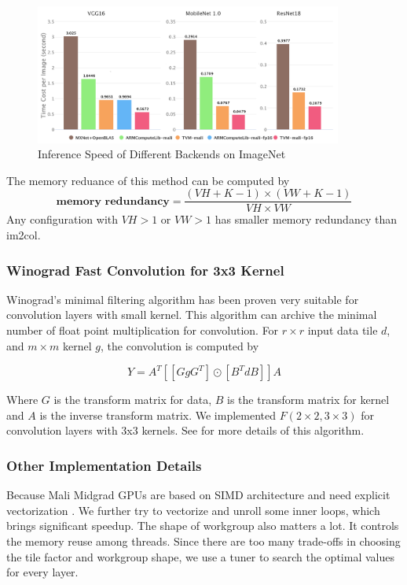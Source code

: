 \documentclass[sigplan]{acmart}
\begin{document}
\begin{figure}[h]
\centering
\includegraphics[width=0.9\textwidth]{figures/new_results.png}
\caption{Inference Speed of Different Backends on ImageNet}
\label{fig:end}
\end{figure}

The memory reduance of this method can be computed by
$$\textbf{memory redundancy} = \frac{(VH + K -1) \times (VW + K - 1)}{VH \times VW}$$
Any configuration  with $VH > 1$ or $VW > 1$ has smaller memory redundancy than im2col. 


\subsubsection{Winograd Fast Convolution for 3x3 Kernel}
Winograd's minimal filtering algorithm has been proven very suitable for convolution layers with small kernel\cite{winograd1980arith, lavin2016fast}. This algorithm can archive the minimal number of float point multiplication for convolution.
For $r\times r$ input data tile  $d$, and $m \times m$ kernel $g$, the convolution is computed by

$$ Y = A^T[[GgG^T] \odot [B^TdB]]A $$

Where $G$ is the transform matrix for data, $B$ is the transform matrix for kernel and $A$ is the inverse transform matrix. We implemented $F(2\times2, 3\times3)$ for convolution layers with 3x3 kernels. See \cite{lavin2016fast} for
 more details of  this algorithm.

\subsubsection{Other Implementation Details}
Because Mali Midgrad GPUs are based on SIMD architecture and need explicit vectorization \cite{armoopenclguide}.
We further try to vectorize and unroll some inner loops, which brings significant speedup.
The shape of workgroup also matters a lot. It controls the memory reuse among threads.
Since there are too many trade-offs in choosing the tile factor and workgroup shape,
we use a tuner to search the optimal values for every layer.
\end{document}
